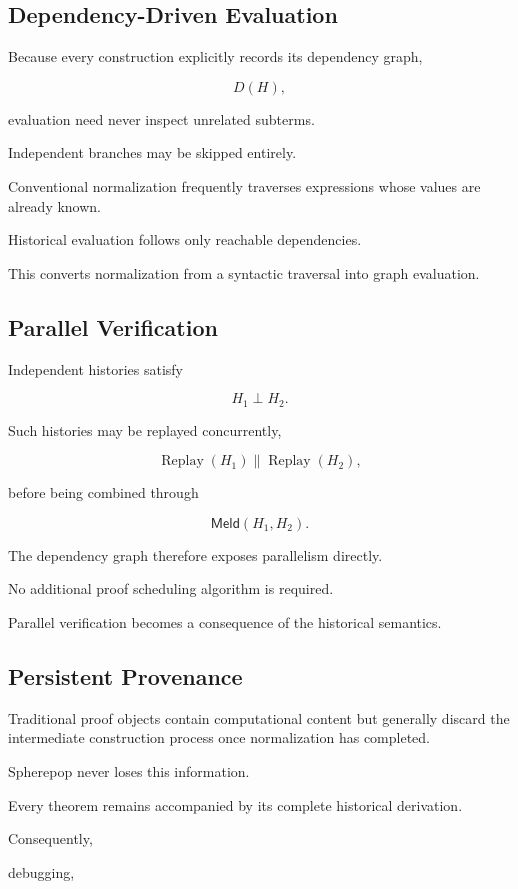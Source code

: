\documentclass[12pt,oneside]{article}
\theoremstyle{definition}
\theoremstyle{remark}
\newcommand{\Meld}{\mathsf{Meld}}
\DeclareMathOperator{\Replay}{Replay}
\begin{document}
\subsection{Dependency-Driven Evaluation}

Because every construction explicitly records its dependency graph,

\[
D(H),
\]

evaluation need never inspect unrelated subterms.

Independent branches may be skipped entirely.

Conventional normalization frequently traverses expressions whose values are
already known.

Historical evaluation follows only reachable dependencies.

This converts normalization from a syntactic traversal into graph evaluation.

\subsection{Parallel Verification}

Independent histories satisfy

\[
H_1
\perp
H_2.
\]

Such histories may be replayed concurrently,

\[
\Replay(H_1)
\parallel
\Replay(H_2),
\]

before being combined through

\[
\Meld(H_1,H_2).
\]

The dependency graph therefore exposes parallelism directly.

No additional proof scheduling algorithm is required.

Parallel verification becomes a consequence of the historical semantics.

\subsection{Persistent Provenance}

Traditional proof objects contain computational content but generally discard
the intermediate construction process once normalization has completed.

Spherepop never loses this information.

Every theorem remains accompanied by its complete historical derivation.

Consequently,

debugging,
\end{document}
